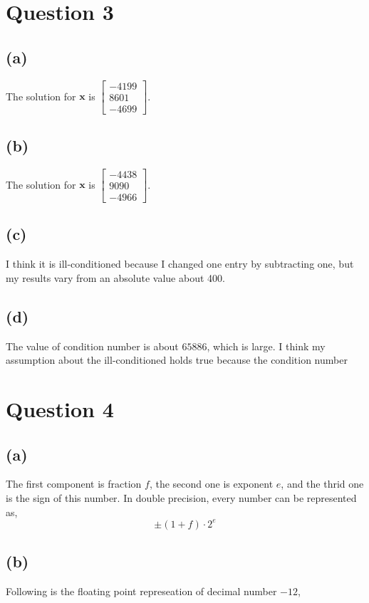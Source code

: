 \documentclass{article}
\newcommand{\bmat}[1]{\begin{bmatrix} #1 \end{bmatrix}}
\newcommand{\mat}[1]{\mathbf{#1}}
\begin{document}
\section*{Question 3}

\subsection*{(a)}
The solution for $\mat{x}$ is $\bmat{-4199\\8601\\-4699}$.

\subsection*{(b)}
The solution for $\mat{x}$ is $\bmat{-4438\\9090\\-4966}$.


\subsection*{(c)}
I think it is ill-conditioned because I changed one entry by subtracting
one, but my results vary from an absolute value about 400.


\subsection*{(d)}
The value of condition number is about $65886$, which is large. I think my assumption about
the ill-conditioned holds true because the condition number 




\section*{Question 4}

\subsection*{(a)}
The first component is fraction $f$, the second one is exponent $e$, and the thrid one 
is the sign of this number. In double precision, every number can be represented as,
$$\pm (1+f) \cdot 2^{e}$$


\subsection*{(b)}

Following is the floating point represeation of decimal number $-12$,
\end{document}
